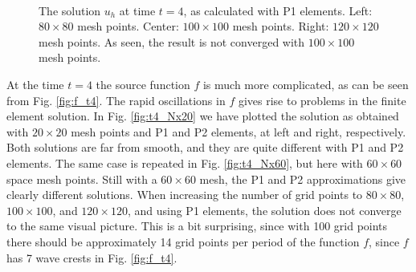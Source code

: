 \documentclass[twoside]{article}
\begin{document}
\begin{figure}
  \centering
  \mbox{
    \quad
    \quad 
  }
  \centering
  \caption{The solution $u_{h}$ at time $t = 4$, as calculated with P1 elements. Left: $80 \times 80$ mesh points. Center: $100 \times 100$ mesh points. Right: $120 \times 120$ mesh points. As seen, the result is not converged with $100 \times 100$ mesh points.}

\end{figure}

At the time $t = 4$ the source function $f$ is much more complicated, as can be seen from Fig. \ref{fig:f_t4}. The rapid oscillations in $f$ gives rise to problems in the finite element solution. In Fig. \ref{fig:t4_Nx20} we have plotted the solution as obtained with $20 \times 20$ mesh points and P1 and P2 elements, at left and right, respectively. Both solutions are far from smooth, and they are quite different with P1 and P2 elements. The same case is repeated in Fig. \ref{fig:t4_Nx60}, but here with $60 \times 60$ space mesh points. Still with a $60 \times 60$ mesh, the P1 and P2 approximations give clearly different solutions. When increasing the number of grid points to $80 \times 80$, $100 \times 100$, and $120 \times 120$, and using P1 elements, the solution does not converge to the same visual picture. This is a bit surprising, since with 100 grid points there should be approximately 14 grid points per period of the function $f$, since $f$ has 7 wave crests in Fig. \ref{fig:f_t4}.    
\end{document}
